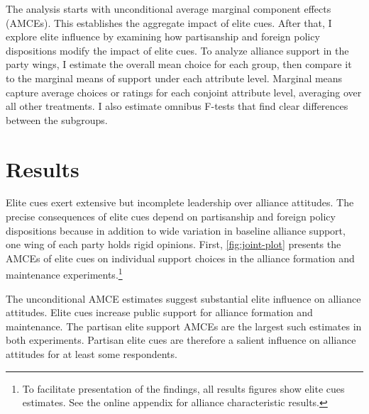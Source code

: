 \documentclass[12pt]{article}
\begin{document}
The analysis starts with unconditional average marginal component effects (AMCEs).
This establishes the aggregate impact of elite cues. 
After that, I explore elite influence by examining how partisanship and foreign policy dispositions modify the impact of elite cues. 
To analyze alliance support in the party wings, I estimate the overall mean choice for each group, then compare it to the marginal means of support under each attribute level.
Marginal means capture average choices or ratings for each conjoint attribute level, averaging over all other treatments. 
I also estimate omnibus F-tests \citep{Leeperetal2020} that find clear differences between the subgroups.  


\section{Results} 


Elite cues exert extensive but incomplete leadership over alliance attitudes.
The precise consequences of elite cues depend on partisanship and foreign policy dispositions because in addition to wide variation in baseline alliance support, one wing of each party holds rigid opinions. 
First, \autoref{fig:joint-plot} presents the AMCEs of elite cues on individual support choices in the alliance formation and maintenance experiments.\footnote{To facilitate presentation of the findings, all results figures show elite cues estimates. See the online appendix for alliance characteristic results.}


The unconditional AMCE estimates suggest substantial elite influence on alliance attitudes. 
Elite cues increase public support for alliance formation and maintenance. 
The partisan elite support AMCEs are the largest such estimates in both experiments.
Partisan elite cues are therefore a salient influence on alliance attitudes for at least some respondents. 
\end{document}
